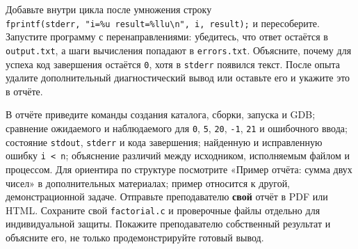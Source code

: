 Добавьте внутри цикла после умножения строку
\texttt{fprintf(stderr,\ "i=\%u\ result=\%llu\textbackslash{}n",\ i,\ result);}
и пересоберите. Запустите программу с перенаправлениями: убедитесь, что
ответ остаётся в \texttt{output.txt}, а шаги вычисления попадают в
\texttt{errors.txt}. Объясните, почему для успеха код завершения
остаётся \texttt{0}, хотя в \texttt{stderr} появился текст. После опыта
удалите дополнительный диагностический вывод или оставьте его и укажите
это в отчёте.

В отчёте приведите команды создания каталога, сборки, запуска и GDB;
сравнение ожидаемого и наблюдаемого для \texttt{0}, \texttt{5},
\texttt{20}, \texttt{-1}, \texttt{21} и ошибочного ввода; состояние
\texttt{stdout}, \texttt{stderr} и кода завершения; найденную и
исправленную ошибку \texttt{i\ \textless{}\ n}; объяснение различий
между исходником, исполняемым файлом и процессом. Для ориентира по
структуре посмотрите «Пример отчёта: сумма двух чисел» в дополнительных
материалах; пример относится к другой, демонстрационной задаче.
Отправьте преподавателю \textbf{свой} отчёт в PDF или HTML. Сохраните
свой \texttt{factorial.c} и проверочные файлы отдельно для
индивидуальной защиты. Покажите преподавателю собственный результат и
объясните его, не только продемонстрируйте готовый вывод.
